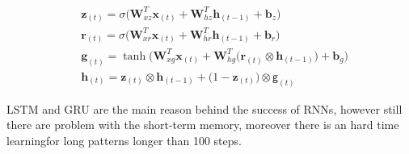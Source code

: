 \vspace{-1cm}
\begin{align}
    &\mathbf{z}_{(t)}=\sigma\big(
        \mathbf{W}_{xz}^T \mathbf{x}_{(t)}+
        \mathbf{W}_{hz}^T \mathbf{h}_{(t-1)}+
        \mathbf{b}_{z}
    \big)\\
    &\mathbf{r}_{(t)}=\sigma\big(
        \mathbf{W}_{xr}^T \mathbf{x}_{(t)}+
        \mathbf{W}_{hr}^T \mathbf{h}_{(t-1)}+\mathbf{b}_{r}
    \big)\\
    &\mathbf{g}_{(t)}=\tanh\big(
        \mathbf{W}_{xg}^T \mathbf{x}_{(t)}+
        \mathbf{W}_{hg}^T \big(\mathbf{r}_{(t)}\otimes\mathbf{h}_{(t-1)}\big)+\mathbf{b}_{g}
    \big)\\
    &\mathbf{h}_{(t)}=\mathbf{z}_{(t)}\otimes\mathbf{h}_{(t-1)} + \big(1-\mathbf{z}_{(t)}\big) \otimes \textsf{g}_{(t)}
\end{align}


\noindent
LSTM and GRU are the main reason behind the success of RNNs, however still there are problem with the short-term memory, moreover there is an hard time learningfor long patterns longer than 100 steps.

